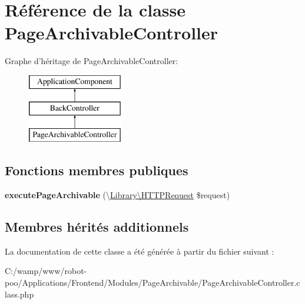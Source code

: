 \hypertarget{class_applications_1_1_frontend_1_1_modules_1_1_page_archivable_1_1_page_archivable_controller}{\section{Référence de la classe Page\+Archivable\+Controller}
\label{class_applications_1_1_frontend_1_1_modules_1_1_page_archivable_1_1_page_archivable_controller}
}
Graphe d'héritage de Page\+Archivable\+Controller\+:\begin{figure}[H]
\begin{center}
\leavevmode
\includegraphics[height=3.000000cm]{class_applications_1_1_frontend_1_1_modules_1_1_page_archivable_1_1_page_archivable_controller}
\end{center}
\end{figure}
\subsection*{Fonctions membres publiques}
\begin{DoxyCompactItemize}
\item 
\hypertarget{class_applications_1_1_frontend_1_1_modules_1_1_page_archivable_1_1_page_archivable_controller_a1132d17c1bf545df6729ca1ebbbc47f7}{{\bfseries execute\+Page\+Archivable} (\textbackslash{}\hyperlink{class_library_1_1_h_t_t_p_request}{Library\textbackslash{}\+H\+T\+T\+P\+Request} \$request)}\label{class_applications_1_1_frontend_1_1_modules_1_1_page_archivable_1_1_page_archivable_controller_a1132d17c1bf545df6729ca1ebbbc47f7}

\end{DoxyCompactItemize}
\subsection*{Membres hérités additionnels}


La documentation de cette classe a été générée à partir du fichier suivant \+:\begin{DoxyCompactItemize}
\item 
C\+:/wamp/www/robot-\/poo/\+Applications/\+Frontend/\+Modules/\+Page\+Archivable/Page\+Archivable\+Controller.\+class.\+php\end{DoxyCompactItemize}
